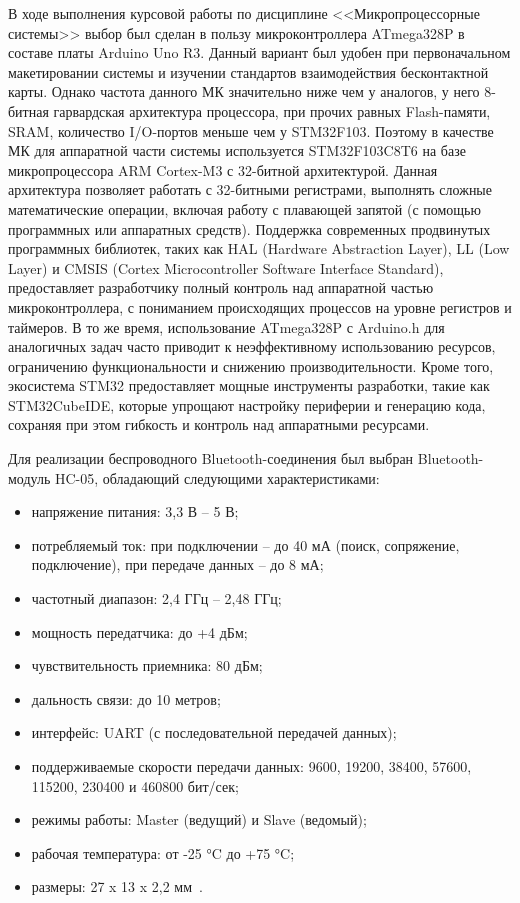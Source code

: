 В ходе выполнения курсовой работы по дисциплине <<Микропроцессорные системы>> выбор был сделан в пользу микроконтроллера ATmega328P в составе платы Arduino Uno R3.
Данный вариант был удобен при первоначальном макетировании системы и изучении стандартов взаимодействия бесконтактной карты.
Однако частота данного МК значительно ниже чем у аналогов, у него 8-битная гарвардская архитектура процессора, при прочих равных Flash-памяти, SRAM, количество I/O-портов меньше чем у STM32F103.
Поэтому в качестве МК для аппаратной части системы используется STM32F103C8T6 на базе микропроцессора ARM Cortex-M3 с 32-битной архитектурой.
Данная архитектура позволяет работать с 32-битными регистрами, выполнять сложные математические операции, включая работу с плавающей запятой (с помощью программных или аппаратных средств).
Поддержка современных продвинутых программных библиотек, таких как HAL (Hardware Abstraction Layer), LL (Low Layer) и CMSIS (Cortex Microcontroller Software Interface Standard), предоставляет разработчику полный контроль над аппаратной частью микроконтроллера, с пониманием происходящих процессов на уровне регистров и таймеров.
В то же время, использование ATmega328P с Arduino.h для аналогичных задач часто приводит к неэффективному использованию ресурсов, ограничению функциональности и снижению производительности.
Кроме того, экосистема STM32 предоставляет мощные инструменты разработки, такие как STM32CubeIDE, которые упрощают настройку периферии и генерацию кода, сохраняя при этом гибкость и контроль над аппаратными ресурсами.

Для реализации беспроводного Bluetooth-соединения был выбран Bluetooth-модуль HC-05, обладающий следующими характеристиками:

\begin{itemize}
    \item напряжение питания: 3,3 В – 5 В;
    \item потребляемый ток: при подключении – до 40 мА (поиск, сопряжение, подключение), при передаче данных – до 8 мА;
    \item частотный диапазон: 2,4 ГГц – 2,48 ГГц;
    \item мощность передатчика: до +4 дБм;
    \item чувствительность приемника: 80 дБм;
    \item дальность связи: до 10 метров;
    \item интерфейс: UART (с последовательной передачей данных);
    \item поддерживаемые скорости передачи данных: 9600, 19200, 38400, 57600, 115200, 230400 и 460800 бит/сек;
    \item режимы работы: Master (ведущий) и Slave (ведомый);
    \item рабочая температура: от -25 °C до +75 °C;
    \item размеры: 27 x 13 x 2,2 мм~\cite{hc05_datasheet}.
\end{itemize}

